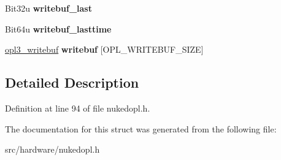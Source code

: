 \begin{DoxyCompactItemize}
\item 
\hypertarget{struct__opl3__chip_a6be94da5a9938ade3ddee7f37551bda7}{Bit32u {\bfseries writebuf\-\_\-last}}\label{struct__opl3__chip_a6be94da5a9938ade3ddee7f37551bda7}

\item 
\hypertarget{struct__opl3__chip_abf4b3a780af44737fd5755d3b906917e}{Bit64u {\bfseries writebuf\-\_\-lasttime}}\label{struct__opl3__chip_abf4b3a780af44737fd5755d3b906917e}

\item 
\hypertarget{struct__opl3__chip_a8fb171bc08a9ef1cb2281127bd75f5b4}{\hyperlink{struct__opl3__writebuf}{opl3\-\_\-writebuf} {\bfseries writebuf} \mbox{[}O\-P\-L\-\_\-\-W\-R\-I\-T\-E\-B\-U\-F\-\_\-\-S\-I\-Z\-E\mbox{]}}\label{struct__opl3__chip_a8fb171bc08a9ef1cb2281127bd75f5b4}

\end{DoxyCompactItemize}


\subsection{Detailed Description}


Definition at line 94 of file nukedopl.\-h.



The documentation for this struct was generated from the following file\-:\begin{DoxyCompactItemize}
\item 
src/hardware/nukedopl.\-h\end{DoxyCompactItemize}
